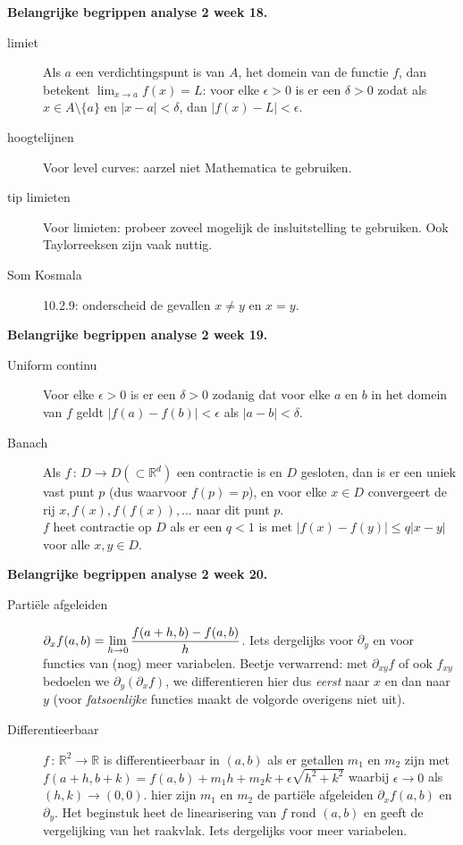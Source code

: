 {\bf Belangrijke begrippen analyse 2 week 18.}
\vskip 8pt
\begin{description}
\item[limiet] Als $a$ een verdichtingspunt is van $A$, het domein van
de functie $f$, dan betekent $\lim_{x\to a} f(x)=L$:
voor elke $\epsilon>0$ is er een $\delta>0$ zodat als 
$x\in A\setminus\{a\}$ en $|x-a|<\delta$, 
dan $|f(x)-L|<\epsilon$.
\item[hoogtelijnen] Voor level curves: aarzel niet Mathematica te gebruiken.
\item[tip limieten] Voor limieten: probeer zoveel mogelijk de insluitstelling
te gebruiken. Ook Taylorreeksen zijn vaak nuttig.
\item[Som Kosmala] 10.2.9: onderscheid de gevallen $x\ne y$ en $x=y$.
\end{description}
\vskip 8pt
{\bf Belangrijke begrippen analyse 2 week 19.}
\begin{description}
\item[Uniform continu] Voor elke $\epsilon>0$ is er
een $\delta>0$ zodanig dat voor elke $a$ en $b$ in het domein van $f$ 
geldt $|f(a)-f(b)|<\epsilon$ als $|a-b|<\delta$.
\item[Banach] Als $f\,:\,D\to D(\subset \mathbb R^d)$ een contractie
is en $D$ gesloten, dan is er een uniek vast punt $p$ (dus waarvoor $f(p)=p$), en voor elke
$x\in D$ convergeert de rij $x,f(x),f(f(x)),\dots$ naar dit punt $p$. \\
$f$ heet contractie op $D$ als er een $q<1$ is met $|f(x)-f(y)|\le q|x-y|$
voor alle $x,y\in D$.
\end{description}
\vskip 8pt
{\bf Belangrijke begrippen analyse 2 week 20.}
\begin{description}
\item[Parti\"ele afgeleiden] $\displaystyle \partial_xf(a,b)=\lim_{h\to 0}\frac{f(a+h,b)-f(a,b)}h$.
Iets dergelijks voor $\partial_y$ en voor functies van (nog) meer variabelen.
Beetje verwarrend: met $\partial_{xy}f$ of ook $f_{xy}$ bedoelen we $\partial_y(\partial_xf)$,
we differentieren hier dus {\em eerst} naar $x$ en dan naar $y$ (voor {\em fatsoenlijke}
functies maakt de volgorde overigens niet uit).
\item[Differentieerbaar] $f\,:\,\mathbb R^2\to\mathbb R$ is differentieerbaar in $(a,b)$
als er getallen $m_1$ en $m_2$ zijn met 
$f(a+h,b+k)=f(a,b)+m_1h+m_2k+\epsilon\sqrt{h^2+k^2}$ waarbij $\epsilon\to0$ als $(h,k)\to(0,0)$.
hier zijn $m_1$ en $m_2$ de parti\"ele afgeleiden $\partial_xf(a,b)$ en $\partial_y$. 
Het beginstuk heet de linearisering van $f$ rond $(a,b)$ en geeft de vergelijking van het
raakvlak. Iets dergelijks voor meer variabelen.
\end{description}